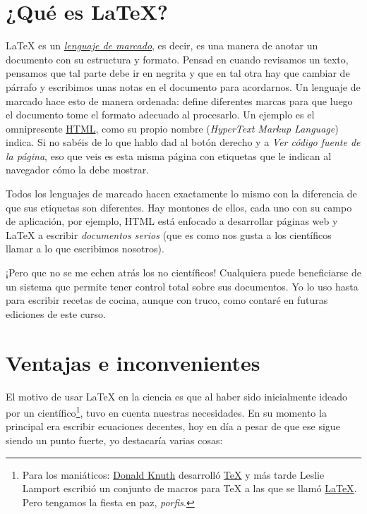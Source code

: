 \section{¿Qué es LaTeX?}\label{que-es-latex}

LaTeX es un
\href{https://es.m.wikipedia.org/wiki/Lenguaje_de_marcado}{\emph{lenguaje
de marcado}}, es decir, es una manera de anotar un documento con su
estructura y formato. Pensad en cuando revisamos un texto, pensamos que
tal parte debe ir en negrita y que en tal otra hay que cambiar de
párrafo y escribimos unas notas en el documento para acordarnos. Un
lenguaje de marcado hace esto de manera ordenada: define diferentes
marcas para que luego el documento tome el formato adecuado al
procesarlo. Un ejemplo es el omnipresente
\href{https://es.m.wikipedia.org/wiki/HTML}{HTML}, como su propio nombre
(\emph{HyperText Markup Language}) indica. Si no sabéis de lo que hablo
dad al botón derecho y a \emph{Ver código fuente de la página}, eso que
veis es esta misma página con etiquetas que le indican al navegador cómo
la debe mostrar.

Todos los lenguajes de marcado hacen exactamente lo mismo con la
diferencia de que sus etiquetas son diferentes. Hay montones de ellos,
cada uno con su campo de aplicación, por ejemplo, HTML está enfocado a
desarrollar páginas web y LaTeX a escribir \emph{documentos serios} (que
es como nos gusta a los científicos llamar a lo que escribimos
nosotros).

¡Pero que no se me echen atrás los no científicos! Cualquiera puede
beneficiarse de un sistema que permite tener control total sobre sus
documentos. Yo lo uso hasta para escribir recetas de cocina, aunque con
truco, como contaré en futuras ediciones de este curso.

\section{Ventajas e inconvenientes}\label{ventajas-e-inconvenientes}

El motivo de usar LaTeX en la ciencia es que al haber sido inicialmente
ideado por un científico\footnote{Para los maniáticos:
\href{https://en.wikipedia.org/wiki/Donald_Knuth}{Donald Knuth}
desarrolló \href{https://en.wikipedia.org/wiki/TeX}{TeX} y más tarde
Leslie Lamport escribió un conjunto de macros para TeX a las que se
llamó \href{http://www.tex.ac.uk/FAQ-latex.html}{LaTeX}. Pero tengamos
la fiesta en paz, \emph{porfis}.}, tuvo en cuenta nuestras
necesidades. En su momento la principal era escribir ecuaciones
decentes, hoy en día a pesar de que ese sigue siendo un punto fuerte, yo
destacaría varias cosas:

